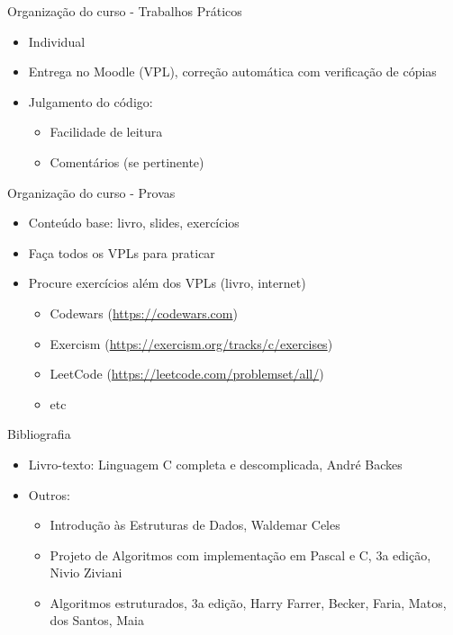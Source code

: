 \documentclass[t, aspectratio=169]{beamer}
\begin{document}
\begin{frame}[label={sec:orgbb34984}]{Organização do curso - Trabalhos Práticos}
\begin{itemize}
\item Individual
\item Entrega no Moodle (VPL), correção automática com verificação de cópias
\item Julgamento do código:
\begin{itemize}
\item Facilidade de leitura
\item Comentários (se pertinente)
\end{itemize}
\end{itemize}
\end{frame}

\begin{frame}[label={sec:org062a72d}]{Organização do curso - Provas}
\begin{itemize}
\item Conteúdo base: livro, slides, exercícios
\item Faça todos os VPLs para praticar
\item Procure exercícios além dos VPLs (livro, internet)
\begin{itemize}
\item Codewars (\url{https://codewars.com})
\item Exercism (\url{https://exercism.org/tracks/c/exercises})
\item LeetCode (\url{https://leetcode.com/problemset/all/})
\item etc
\end{itemize}
\end{itemize}
\end{frame}

\begin{frame}[label={sec:org17c5745}]{Bibliografia}
\begin{itemize}
\item Livro-texto: Linguagem C completa e descomplicada, André Backes

\item Outros:
\begin{itemize}
\item Introdução às Estruturas de Dados, Waldemar Celes
\item Projeto de Algoritmos com implementação em Pascal e C, 3a edição,
Nivio Ziviani
\item Algoritmos estruturados, 3a edição, Harry Farrer, Becker, Faria, Matos,
dos Santos, Maia
\end{itemize}
\end{itemize}
\end{frame}
\end{document}
